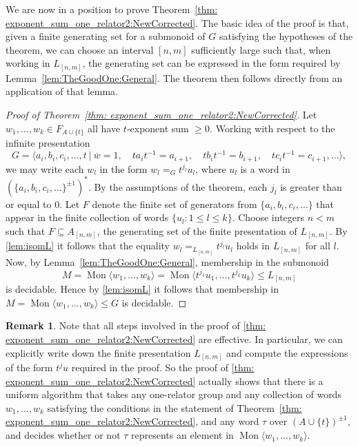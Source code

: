 \documentclass[11pt]{amsart}
\newcommand{\Mgen}[1]{\operatorname{Mon}\bigl\langle #1 \bigr\rangle}
\newcommand{\Gpres}[2]{\bigl\langle #1\:|\:#2 \bigr\rangle}
\theoremstyle{plain}
\theoremstyle{definition}
\newtheorem{remark}[theorem]{Remark}
\begin{document}
We are now in a position to prove Theorem~\ref{thm: exponent_sum_one_relator2:NewCorrected}. The basic idea of the proof is that, given a finite generating set for a submonoid of $G$ satisfying the hypotheses of the theorem, we can choose an interval $[n,m]$ sufficiently large such that, when working in $L_{[n,m]}$, the generating set can be expressed in the form required by Lemma~\ref{lem:TheGoodOne:General}. The theorem then follows directly from an application of that lemma.


\begin{proof}[Proof of Theorem~\ref{thm: exponent_sum_one_relator2:NewCorrected}]
Let $w_1, \ldots, w_k \in F_{A \cup \{t \}}$ all have $t$-exponent sum $\geq 0$. Working with respect to the infinite presentation
\[
G = \Gpres{a_i, b_i, c_i, \ldots, t}{
\overline{w} = 1,\quad
t a_i t^{-1} = a_{i+1},\quad
t b_i t^{-1} = b_{i+1},\quad
t c_i t^{-1} = c_{i+1}, \ldots
},
\]
we may write each $w_l$ in the form $w_l =_G t^{j_l} u_{l}$, where $u_{l}$ is a word in $(\{ a_i, b_i, c_i, \ldots \}^{\pm 1})^*$. By the assumptions of the theorem, each $j_l$ is greater than or equal to $0$. Let $F$ denote the finite set of generators from $\{ a_i, b_i, c_i, \ldots \}$ that appear in the finite collection of words $\{ u_{l}: 1 \leq l \leq k \}$. Choose integers $n < m$ such that $F \subseteq A_{[n,m]}$, the generating set of the finite presentation of $L_{[n,m]}$. By \cref{lem:isomL}  it follows that the equality $w_l =_{L_{[n,m]}} t^{j_l} u_{l}$ holds in $L_{[n,m]}$ for all $l$.
Now, by Lemma~\ref{lem:TheGoodOne:General}, membership in the submonoid
\[
M = \Mgen{w_1, \ldots, w_k} = \Mgen{t^{j_1} u_{1}, \ldots, t^{j_k} u_{k}} \leqslant L_{[n,m]}
\]
is decidable. Hence by \cref{lem:isomL} it follows that membership in $M = \Mgen{w_1, \ldots, w_k} \leqslant G$ is decidable.
\end{proof}

\begin{remark} 
Note that all steps involved in the proof of \cref{thm: exponent_sum_one_relator2:NewCorrected} are effective. In particular, we can explicitly write down the finite presentation $L_{[n,m]}$ and compute the expressions of the form $t^j u$ required in the proof. So the proof of \cref{thm: exponent_sum_one_relator2:NewCorrected} actually shows that there is a uniform algorithm that takes any one-relator group  and any collection of words $w_1, \ldots, w_k$ satisfying the conditions in the statement of Theorem~\ref{thm: exponent_sum_one_relator2:NewCorrected}, and any word $\tau$ over $(A \cup \{t\})^{\pm 1}$, and decides whether or not $\tau$ represents an element in $\Mgen{w_1, \ldots, w_k}$. 
\end{remark}
\end{document}

